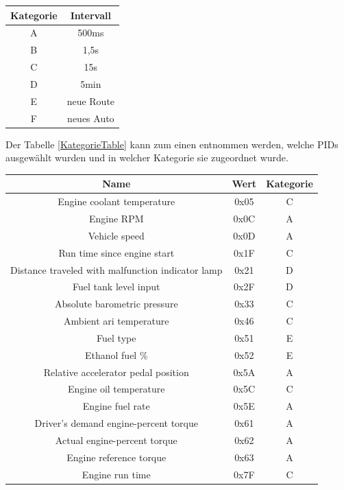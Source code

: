 		\begin{center}
			\begin{tabular}{|c|c|}
				\hline 
				Kategorie & Intervall \\ 
				\hline 
				A & 500ms \\ 
				\hline 
				B & 1,5s \\ 
				\hline 
				C & 15s \\ 
				\hline 
				D & 5min \\ 
				\hline 
				E & neue Route \\ 
				\hline 
				F & neues Auto \\ 
				\hline 
			\end{tabular} 
			\label{KategorieTable}		
		\end{center}

		
		Der Tabelle \ref{KategorieTable} kann zum einen entnommen werden, welche \acp{PID} ausgewählt wurden und in welcher Kategorie sie zugeordnet wurde.
		
		\begin{center}
			\begin{tabular}{|c|c|c|}
				\hline 
				Name & Wert & Kategorie \\ 
				\hline 
				Engine coolant temperature & 0x05 & C \\ 
				\hline 
				Engine RPM & 0x0C & A \\ 
				\hline 
				Vehicle speed & 0x0D & A \\ 
				\hline 
				Run time since engine start & 0x1F & C \\ 
				\hline 
				Distance traveled with malfunction indicator lamp & 0x21 & D \\ 
				\hline 
				Fuel tank level input & 0x2F & D \\ 
				\hline 
				Absolute barometric pressure & 0x33 & C \\ 
				\hline 
				Ambient ari temperature & 0x46 & C \\ 
				\hline 
				Fuel type & 0x51 & E \\ 
				\hline 
				Ethanol fuel \% & 0x52 & E \\ 
				\hline 
				Relative accelerator pedal position & 0x5A & A \\ 
				\hline 
				Engine oil temperature & 0x5C & C \\ 
				\hline 
				Engine fuel rate & 0x5E & A \\ 
				\hline 
				Driver's demand engine-percent torque & 0x61 & A \\ 
				\hline 
				Actual engine-percent torque & 0x62 & A \\ 
				\hline 
				Engine reference torque & 0x63 & A \\ 
				\hline 
				Engine run time & 0x7F & C \\ 
				\hline 
			\end{tabular} 
		\end{center}
		

